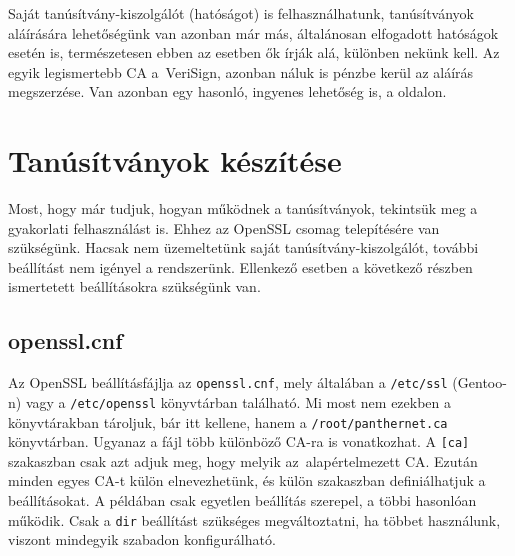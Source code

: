 Saját tanúsítvány-kiszolgálót (hatóságot) is felhasználhatunk, tanúsítványok aláírására lehetőségünk van azonban már
más, általánosan elfogadott hatóságok esetén is, természetesen ebben az esetben ők írják alá, különben nekünk kell. Az
egyik legismertebb CA a~VeriSign, azonban náluk is pénzbe kerül az aláírás megszerzése. Van azonban egy hasonló,
ingyenes lehetőség is, a  oldalon.

\section{Tanúsítványok készítése}
Most, hogy már tudjuk, hogyan működnek a tanúsítványok, tekintsük meg a gyakorlati felhasználást is. Ehhez az OpenSSL
csomag telepítésére van szükségünk. Hacsak nem üzemeltetünk saját tanúsítvány-kiszolgálót, további beállítást nem
igényel a rendszerünk. Ellenkező esetben a következő részben ismertetett beállításokra szükségünk van.

\subsection{openssl.cnf}
Az OpenSSL beállításfájlja az \texttt{openssl.cnf}, mely általában a \texttt{/etc/ssl} (Gentoo-n) vagy a
\texttt{/etc/openssl} könyvtárban található. Mi most nem
ezekben a könyvtárakban tároljuk, bár itt kellene, hanem a \texttt{/root/panthernet.ca} könyvtárban. Ugyanaz a fájl több
különböző CA-ra is vonatkozhat. A \texttt{[ca]} szakaszban csak azt adjuk meg, hogy melyik az~alapértelmezett CA. Ezután
minden egyes CA-t külön elnevezhetünk, és külön szakaszban definiálhatjuk a beállításokat. A példában csak egyetlen
beállítás szerepel, a többi hasonlóan működik. Csak a \texttt{dir} beállítást szükséges megváltoztatni, ha többet
használunk, viszont mindegyik szabadon konfigurálható.

